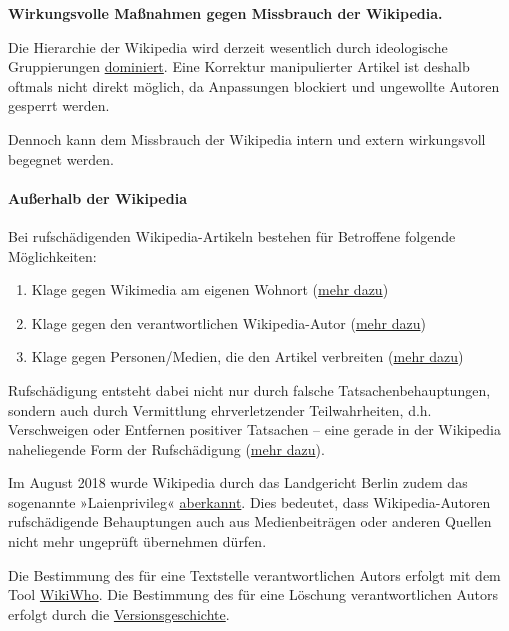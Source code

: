 \textbf{Wirkungsvolle Maßnahmen gegen Missbrauch der Wikipedia.}

Die Hierarchie der Wikipedia wird derzeit wesentlich durch ideologische
Gruppierungen
\href{https://swprs.org/wikipedia-manipulation-autoren/}{dominiert}.
Eine Korrektur manipulierter Artikel ist deshalb oftmals nicht direkt
möglich, da Anpassungen blockiert und ungewollte Autoren gesperrt
werden.

Dennoch kann dem Missbrauch der Wikipedia intern und extern wirkungsvoll
begegnet werden.

\hypertarget{auuxdferhalb-der-wikipedia}{%
\paragraph{Außerhalb der Wikipedia}\label{auuxdferhalb-der-wikipedia}}

Bei rufschädigenden Wikipedia-Artikeln bestehen für Betroffene folgende
Möglichkeiten:

\begin{enumerate}
\def\labelenumi{\arabic{enumi}.}
\tightlist
\item
  Klage gegen Wikimedia am eigenen Wohnort
  (\href{https://swprs.org/weiteres-urteil-im-fall-wikipedia/}{mehr
  dazu})
\item
  Klage gegen den verantwortlichen Wikipedia-Autor
  (\href{https://swprs.org/der-wikipedia-prozess/}{mehr dazu})
\item
  Klage gegen Personen/Medien, die den Artikel verbreiten
  (\href{https://www.mll-news.com/oger-zh-liken-ehrverletzender-posts-ist-strafrechtliches-weiterverbreiten-und-ueble-nachrede/}{mehr
  dazu})
\end{enumerate}

Rufschädigung entsteht dabei nicht nur durch falsche
Tatsachen­be­hauptungen, sondern auch durch Vermittlung ehrverletzender
Teil­wahr­heiten, d.h. Verschweigen oder Entfernen positiver Tatsachen
-- eine gerade in der Wikipedia naheliegende Form der Rufschädigung
(\href{https://lexetius.com/1999,1148}{mehr dazu}).

Im August 2018 wurde Wikipedia durch das Landgericht Berlin zudem das
sogenannte »Laienprivileg«
\href{https://www.heise.de/newsticker/meldung/Urteil-gegen-Wikipedia-Keine-rufschaedigende-Kritik-ohne-Recherche-4209610.html}{aberkannt}.
Dies bedeutet, dass Wikipedia-Autoren rufschädigende Behauptungen auch
aus Medien­beiträgen oder anderen Quellen nicht mehr ungeprüft
übernehmen dürfen.

Die Bestimmung des für eine Textstelle verantwortlichen Autors erfolgt
mit dem Tool \href{https://f-squared.org/whovisual/}{WikiWho}. Die
Bestimmung des für eine Löschung verantwortlichen Autors erfolgt durch
die
\href{https://de.wikipedia.org/wiki/Hilfe:Versionen}{Versionsgeschichte}.

